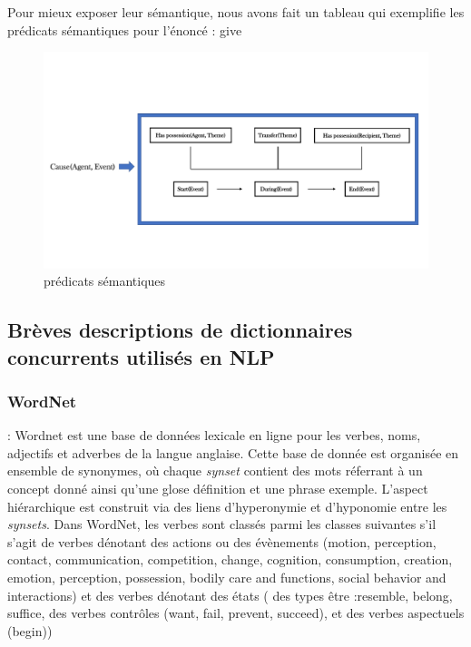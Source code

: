 Pour mieux exposer leur sémantique, nous avons fait un tableau qui exemplifie les prédicats sémantiques pour l'énoncé : give
\begin{figure}[h]
	\centering
	\includegraphics[width=1\textwidth, trim = {0cm 2cm 0cm 2cm},clip]{ch2/figs/semantics_give.pdf}
	\caption{prédicats sémantiques}
	\label{fig:Prédicat}
\end{figure}

\subsection{Brèves descriptions de dictionnaires concurrents utilisés en NLP}

\subsubsection{WordNet} : Wordnet est une base de données lexicale en ligne pour les verbes, noms, adjectifs et adverbes de la langue anglaise. Cette base de donnée est organisée en ensemble de synonymes, où chaque \emph{synset} contient des mots réferrant à un concept donné ainsi qu'une glose définition et une phrase exemple. L'aspect hiérarchique est construit via des liens d'hyperonymie et d'hyponomie entre les \emph{synsets}. Dans WordNet, les verbes sont classés parmi les classes suivantes s'il s'agit de verbes dénotant des actions ou des évènements (motion, perception, contact, communication, competition, change, cognition, consumption, creation, emotion, perception, possession, bodily care and functions, social behavior and interactions) et des verbes dénotant des états ( des types être :resemble, belong, suffice, des verbes contrôles (want, fail, prevent, succeed), et des verbes aspectuels (begin)) \citep{Fellbaum1998}

